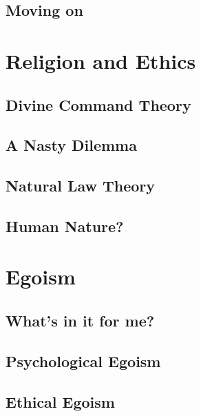 \documentclass[justified]{tufte-book}
\begin{document}
\hypertarget{moving-on}{%
\section{Moving on}\label{moving-on}}

\hypertarget{religion-and-ethics}{%
\chapter{Religion and Ethics}\label{religion-and-ethics}}

\hypertarget{divine-command-theory}{%
\section{Divine Command Theory}\label{divine-command-theory}}

\hypertarget{a-nasty-dilemma}{%
\section{A Nasty Dilemma}\label{a-nasty-dilemma}}

\hypertarget{natural-law-theory}{%
\section{Natural Law Theory}\label{natural-law-theory}}

\hypertarget{human-nature}{%
\section{Human Nature?}\label{human-nature}}

\hypertarget{egoism}{%
\chapter{Egoism}\label{egoism}}

\hypertarget{whats-in-it-for-me}{%
\section{What's in it for me?}\label{whats-in-it-for-me}}

\hypertarget{psychological-egoism}{%
\section{Psychological Egoism}\label{psychological-egoism}}

\hypertarget{ethical-egoism}{%
\section{Ethical Egoism}\label{ethical-egoism}}
\end{document}
